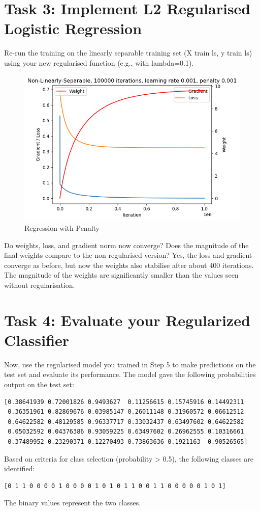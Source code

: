 \documentclass[11pt]{article}
\begin{document}
\section{Task 3: Implement L2 Regularised Logistic Regression}
Re-run the training on the linearly separable training set (X train ls, y train ls) using your new regularised function (e.g., with lambda=0.1).

\begin{figure}[h]
    \centering
    \includegraphics[width=0.5\linewidth]{3.png}
    \caption{Regression with Penalty}
    \label{fig 3}
\end{figure}

Do weights, loss, and gradient norm now converge? Does the magnitude of the final weights compare to the non-regularised version?
Yes, the loss and gradient converge as before, but now the weights also stabilise after about 400 iterations. The magnitude of the weights are significantly smaller than the values seen without regularisation. 

\section{Task 4: Evaluate your Regularized Classifier}
Now, use the regularised model you trained in Step 5 to make predictions on the test set and evaluate its performance.
The model gave the following probabilities output on the test set:
\begin{verbatim}
[0.38641939 0.72001826 0.9493627  0.11256615 0.15745916 0.14492311
 0.36351961 0.82869676 0.03985147 0.26011148 0.31960572 0.06612512
 0.64622582 0.48129585 0.96337717 0.33032437 0.63497602 0.64622582
 0.05032592 0.04376386 0.93059225 0.63497602 0.26962555 0.10316661
 0.37489952 0.23290371 0.12270493 0.73863636 0.1921163  0.90526565]
 \end{verbatim}
 Based on criteria for class selection (probability > 0.5), the following classes are identified:
\begin{verbatim}
[0 1 1 0 0 0 0 1 0 0 0 0 1 0 1 0 1 1 0 0 1 1 0 0 0 0 0 1 0 1]
\end{verbatim}
The binary values represent the two classes.
\end{document}
